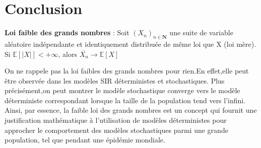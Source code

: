 \chapter{Conclusion}

\textbf{Loi faible des grands nombres} : Soit $(X_n)_{n \in \boldsymbol{N}}$ une suite de variable aléatoire indépendante et identiquement distribuée de même loi que X (loi mère). Si $\mathbb{E}[|X|] < +\infty$, alors $\overline{X_n} \rightarrow \mathbb{E}[X]$

On ne rappele pas la loi faibles des grands nombres pour rien.En effet,elle peut être observée dans les modèles SIR déterministes et stochastiques. Plus précisément,on peut montrer le modèle stochastique converge vers le modèle déterministe correspondant lorsque la taille de la population tend vers l'infini. Ainsi, par essence, la faible loi des grands nombres est un concept qui fournit une justification mathématique à l'utilisation de modèles déterministes pour approcher le comportement des modèles stochastiques parmi une grande population, tel que pendant une épidémie mondiale.

